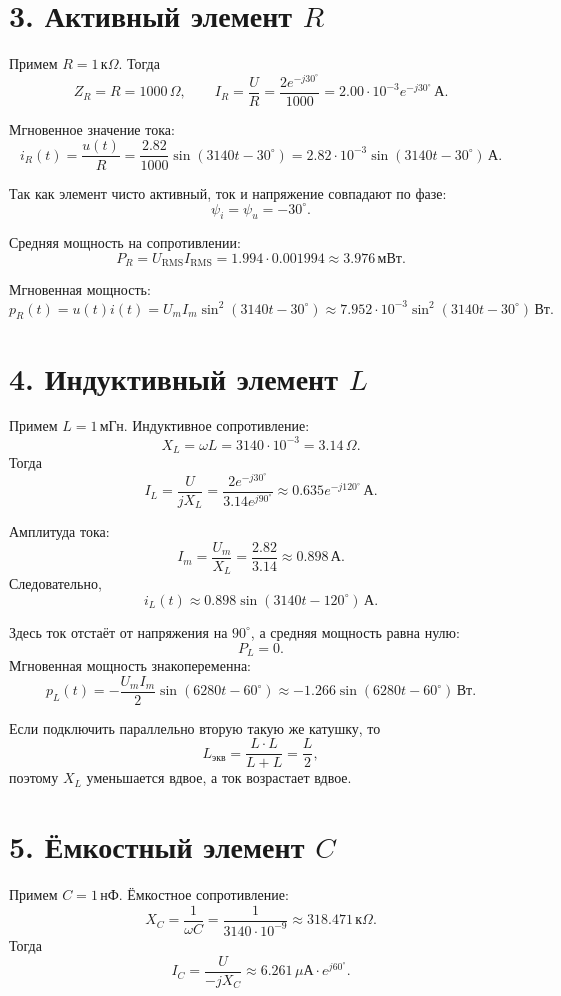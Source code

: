 \documentclass[12pt,a4paper]{article}
\begin{document}
\section*{3. Активный элемент $R$}
Примем $R=1\,\text{к}\Omega$. Тогда
\[
Z_R=R=1000\,\Omega, \qquad
  I_R=\frac{  U}{R}=\frac{2e^{-j30^\circ}}{1000}
=2.00\cdot 10^{-3}e^{-j30^\circ}\,\text{А}.
\]

Мгновенное значение тока:
\[
i_R(t)=\frac{u(t)}R=\frac{2.82}{1000}\sin(3140t-30^\circ)
=2.82\cdot 10^{-3}\sin(3140t-30^\circ)\,\text{А}.
\]

Так как элемент чисто активный, ток и напряжение совпадают по фазе:
\[
\psi_i=\psi_u=-30^\circ.
\]

Средняя мощность на сопротивлении:
\[
P_R=U_{\text{RMS}}I_{\text{RMS}}
=1.994\cdot 0.001994
\approx 3.976\,\text{мВт}.
\]

Мгновенная мощность:
\[
p_R(t)=u(t)i(t)=U_mI_m\sin^2(3140t-30^\circ)
\approx 7.952\cdot 10^{-3}\sin^2(3140t-30^\circ)\,\text{Вт}.
\]

\section*{4. Индуктивный элемент $L$}
Примем $L=1\,\text{мГн}$. Индуктивное сопротивление:
\[
X_L=\omega L=3140\cdot 10^{-3}= 3.14\,\Omega.
\]
Тогда
\[
  I_L=\frac{  U}{jX_L}
=\frac{2e^{-j30^\circ}}{3.14e^{j90^\circ}}
\approx 0.635e^{-j120^\circ}\,\text{А}.
\]

Амплитуда тока:
\[
I_m=\frac{U_m}{X_L}=\frac{2.82}{3.14}\approx 0.898\,\text{А}.
\]
Следовательно,
\[
i_L(t)\approx 0.898\sin(3140t-120^\circ)\,\text{А}.
\]

Здесь ток отстаёт от напряжения на $90^\circ$, а средняя мощность равна нулю:
\[
  P_L = 0.
\]
Мгновенная мощность знакопеременна:
\[
p_L(t)= -\frac{U_mI_m}2\sin(6280t-60^\circ)
\approx -1.266\sin(6280t-60^\circ)\,\text{Вт}.
\]

Если подключить параллельно вторую такую же катушку, то
\[
L_{\text{экв}}=\frac{L\cdot L}{L+L}=\frac L2,
\]
поэтому $X_L$ уменьшается вдвое, а ток возрастает вдвое.

\section*{5. Ёмкостный элемент $C$}
Примем $C=1\,\text{нФ}$. Ёмкостное сопротивление:
\[
X_C=\frac1{\omega C}=\frac1{3140\cdot 10^{-9}}
\approx 318.471\,\text{к}\Omega.
\]
Тогда
\[
  I_C=\frac{  U}{-jX_C}
\approx 6.261\, \mu\text{А}\cdot e^{j60^\circ}.
\]
\end{document}

